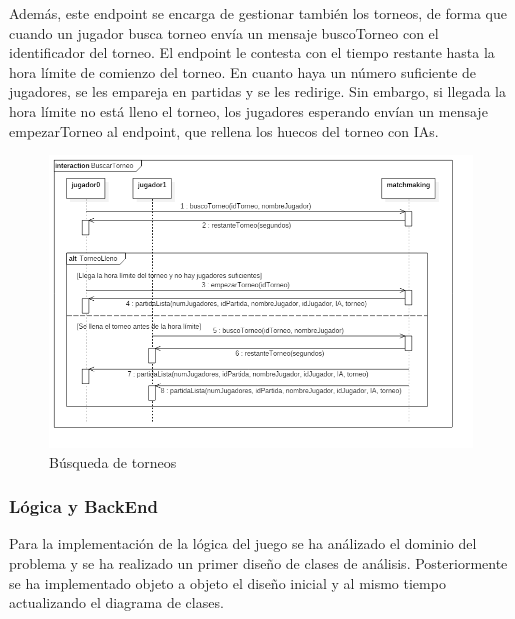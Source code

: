 Además, este endpoint se encarga de gestionar también los torneos, de forma que cuando un jugador busca torneo envía un mensaje buscoTorneo
con el identificador del torneo. El endpoint le contesta con el tiempo restante hasta la hora límite de comienzo del torneo. En cuanto haya
un número suficiente de jugadores, se les empareja en partidas y se les redirige. Sin embargo, si llegada la hora límite no está lleno el torneo,
los jugadores esperando envían un mensaje empezarTorneo al endpoint, que rellena los huecos del torneo con IAs.\\

\begin{figure}[H]
  \includegraphics[width=\linewidth]{figuras/diagramasSecuencia/buscarTorneo.png}
  \caption{Búsqueda de torneos}
  \label{fig:buscarTorneo}
\end{figure}

\subsubsection{Lógica y BackEnd}

Para la implementación de la lógica del juego se ha análizado el dominio del problema y se ha realizado un primer diseño de clases de análisis. Posteriormente se ha implementado objeto a objeto el diseño inicial y al mismo tiempo actualizando el diagrama de clases.

